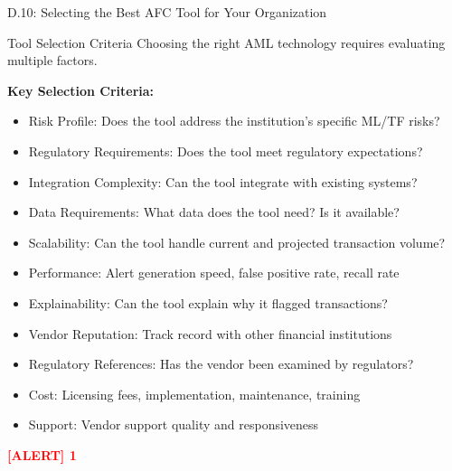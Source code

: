 \documentclass[11pt,a4paper]{beamer}
\newcommand{\redflag}[1]{\textcolor{red}{\textbf{[ALERT] 1}}}
\begin{document}
\begin{frame}{D.10: Selecting the Best AFC Tool for Your Organization}
	\begin{block}{Tool Selection Criteria}
		Choosing the right AML technology requires evaluating multiple factors.
	\end{block}
	\textbf{Key Selection Criteria:}
	\begin{itemize}
		\item Risk Profile: Does the tool address the institution's specific ML/TF risks?
		\item Regulatory Requirements: Does the tool meet regulatory expectations?
		\item Integration Complexity: Can the tool integrate with existing systems?
		\item Data Requirements: What data does the tool need? Is it available?
		\item Scalability: Can the tool handle current and projected transaction volume?
		\item Performance: Alert generation speed, false positive rate, recall rate
		\item Explainability: Can the tool explain why it flagged transactions?
		\item Vendor Reputation: Track record with other financial institutions
		\item Regulatory References: Has the vendor been examined by regulators?
		\item Cost: Licensing fees, implementation, maintenance, training
		\item Support: Vendor support quality and responsiveness
	\end{itemize}
	\redflag{The cheapest tool is rarely the best choice. Effectiveness must be prioritized.}
\end{frame}
\end{document}
